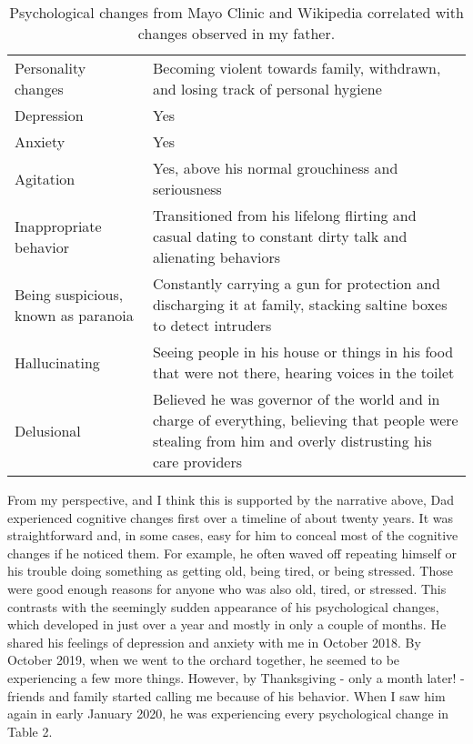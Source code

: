 \documentclass{article}
\begin{document}
\begin{table}[h!]
\centering
\begin{tabularx}{ 0.8\textwidth }{ | >{\raggedright\arraybackslash}X | >{\centering\arraybackslash}X | }
 \hline
 \multicolumn{2}{|c|}{Psychological Changes in Dad} \\
 \hline
 Personality changes & Becoming violent towards family, withdrawn, and losing track of personal hygiene \\
 \hline
 Depression & Yes \\
 \hline
 Anxiety & Yes  \\
 \hline
 Agitation & Yes, above his normal grouchiness and seriousness \\
 \hline
 Inappropriate behavior & Transitioned from his lifelong flirting and casual dating to constant dirty talk and alienating behaviors \\
 \hline
 Being suspicious, known as paranoia & Constantly carrying a gun for protection and discharging it at family, stacking saltine boxes to detect intruders \\
 \hline
 Hallucinating & Seeing people in his house or things in his food that were not there, hearing voices in the toilet \\
 \hline
 Delusional & Believed he was governor of the world and in charge of everything, believing that people were stealing from him and overly distrusting his care providers \\
 \hline
\end{tabularx}
\caption{Psychological changes from Mayo Clinic and Wikipedia correlated with changes observed in my father.}
\end{table}

From my perspective, and I think this is supported by the narrative above, Dad experienced cognitive changes first over a timeline of about twenty years. It was straightforward and, in some cases, easy for him to conceal most of the cognitive changes if he noticed them. For example, he often waved off repeating himself or his trouble doing something as getting old, being tired, or being stressed. Those were good enough reasons for anyone who was also old, tired, or stressed. This contrasts with the seemingly sudden appearance of his psychological changes, which developed in just over a year and mostly in only a couple of months. He shared his feelings of depression and anxiety with me in October 2018. By October 2019, when we went to the orchard together, he seemed to be experiencing a few more things. However, by Thanksgiving - only a month later! - friends and family started calling me because of his behavior. When I saw him again in early January 2020, he was experiencing every psychological change in Table 2. 
\end{document}
